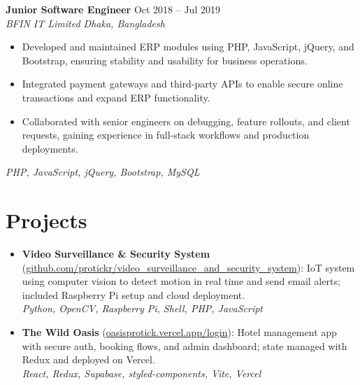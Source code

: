 \documentclass[a4paper,10pt]{article}
\begin{document}
\vspace{1pt}

\textbf{Junior Software Engineer} \hfill Oct 2018 -- Jul 2019\\[-2pt]
\textit{BFIN IT Limited \textbar{} Dhaka, Bangladesh}\\[-4pt]
\begin{itemize}
  \item Developed and maintained ERP modules using PHP, JavaScript, jQuery, and Bootstrap, ensuring stability and usability for business operations.
  \item Integrated payment gateways and third-party APIs to enable secure online transactions and expand ERP functionality.
  \item Collaborated with senior engineers on debugging, feature rollouts, and client requests, gaining experience in full-stack workflows and production deployments.
\end{itemize}
\emph{PHP, JavaScript, jQuery, Bootstrap, MySQL}

\section*{Projects}
\begin{itemize}
  \item \textbf{Video Surveillance \& Security System} (\href{https://github.com/protickr/video_surveillance_and_security_system}{github.com/protickr/video\_surveillance\_and\_security\_system}): IoT system using computer vision to detect motion in real time and send email alerts; included Raspberry Pi setup and cloud deployment.\\
  \emph{Python, OpenCV, Raspberry Pi, Shell, PHP, JavaScript}
  \vspace{1pt}
  \item \textbf{The Wild Oasis} (\href{https://oasisprotick.vercel.app/login}{oasisprotick.vercel.app/login}): Hotel management app with secure auth, booking flows, and admin dashboard; state managed with Redux and deployed on Vercel.\\
 \emph{React, Redux, Supabase, styled-components, Vite, Vercel}
\end{itemize}

\end{document}
